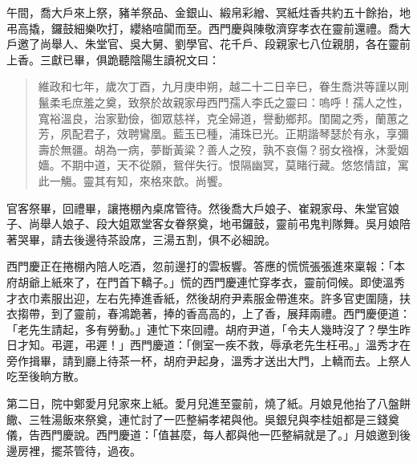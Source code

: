 午間，喬大戶來上祭，豬羊祭品、金銀山、緞帛彩繒、冥紙炷香共約五十餘抬，地弔高撬，鑼鼓細樂吹打，纓絡喧闐而至。西門慶與陳敬濟穿孝衣在靈前還禮。喬大戶邀了尚舉人、朱堂官、吳大舅、劉學官、花千戶、段親家七八位親朋，各在靈前上香。三獻已畢，俱跪聽陰陽生讀祝文曰：
\begin{quote}
維政和七年，歲次丁酉，九月庚申朔，越二十二日辛巳，眷生喬洪等謹以剛鬣柔毛庶羞之奠，致祭於故親家母西門孺人李氏之靈曰：嗚呼！孺人之性，寬裕溫良，治家勤儉，御眾慈祥，克全婦道，譽動鄉邦。閨閫之秀，蘭蕙之芳，夙配君子，效聘鸞凰。藍玉已種，浦珠已光。正期諧琴瑟於有永，享彌壽於無疆。胡為一病，夢斷黃粱？善人之歿，孰不哀傷？弱女襁褓，沐愛姻嬙。不期中道，天不從願，鴛伴失行。恨隔幽冥，莫睹行藏。悠悠情誼，寓此一觴。靈其有知，來格來歆。尚饗。
\end{quote}

官客祭畢，回禮畢，讓捲棚內桌席管待。然後喬大戶娘子、崔親家母、朱堂官娘子、尚舉人娘子、段大姐眾堂客女眷祭奠，地弔鑼鼓，靈前弔鬼判隊舞。吳月娘陪著哭畢，請去後邊待茶設席，三湯五割，俱不必細說。

西門慶正在捲棚內陪人吃酒，忽前邊打的雲板響。答應的慌慌張張進來稟報：「本府胡爺上紙來了，在門首下轎子。」慌的西門慶連忙穿孝衣，靈前伺候。即使溫秀才衣巾素服出迎，左右先捧進香紙，然後胡府尹素服金帶進來。許多官吏圍隨，扶衣搊帶，到了靈前，春鴻跪著，捧的香高高的，上了香，展拜兩禮。西門慶便道：「老先生請起，多有勞動。」連忙下來回禮。胡府尹道，「令夫人幾時沒了？學生昨日才知。弔遲，弔遲！」西門慶道：「側室一疾不救，辱承老先生枉弔。」溫秀才在旁作揖畢，請到廳上待茶一杯，胡府尹起身，溫秀才送出大門，上轎而去。上祭人吃至後晌方散。

第二日，院中鄭愛月兒家來上紙。愛月兒進至靈前，燒了紙。月娘見他抬了八盤餅饊、三牲湯飯來祭奠，連忙討了一匹整絹孝裙與他。吳銀兒與李桂姐都是三錢奠儀，告西門慶說。西門慶道：「值甚麼，每人都與他一匹整絹就是了。」月娘邀到後邊房裡，擺茶管待，過夜。

